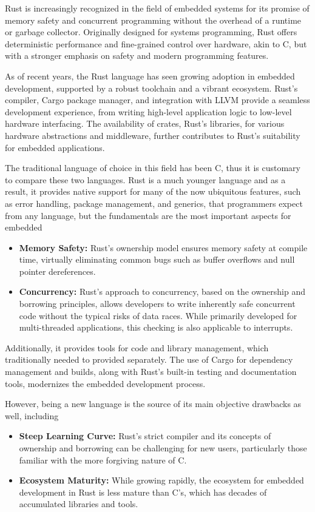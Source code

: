 
Rust is increasingly recognized in the field of embedded systems for its promise of memory safety and concurrent programming without the overhead of a runtime or garbage collector. Originally designed for systems programming, Rust offers deterministic performance and fine-grained control over hardware, akin to C, but with a stronger emphasis on safety and modern programming features.

As of recent years, the Rust language has seen growing adoption in embedded development, supported by a robust toolchain and a vibrant ecosystem. Rust's compiler, Cargo package manager, and integration with LLVM provide a seamless development experience, from writing high-level application logic to low-level hardware interfacing. The availability of crates, Rust's libraries, for various hardware abstractions and middleware, further contributes to Rust's suitability for embedded applications.

The traditional language of choice in this field has been C, thus it is customary to compare these two languages. Rust is a much younger language and as a result, it provides native support for many of the now ubiquitous features, such as error handling, package management, and generics, that programmers expect from any language, but the fundamentals are the most important aspects for embedded
\begin{itemize}
    \item \textbf{Memory Safety:} Rust's ownership model ensures memory safety at compile time, virtually eliminating common bugs such as buffer overflows and null pointer dereferences.
    \item \textbf{Concurrency:} Rust's approach to concurrency, based on the ownership and borrowing principles, allows developers to write inherently safe concurrent code without the typical risks of data races. While primarily developed for multi-threaded applications, this checking is also applicable to interrupts.
\end{itemize}

Additionally, it provides tools for code and library management, which traditionally needed to provided separately. The use of Cargo for dependency management and builds, along with Rust's built-in testing and documentation tools, modernizes the embedded development process.

However, being a new language is the source of its main objective drawbacks as well, including
\begin{itemize}
    \item \textbf{Steep Learning Curve:} Rust's strict compiler and its concepts of ownership and borrowing can be challenging for new users, particularly those familiar with the more forgiving nature of C.
    \item \textbf{Ecosystem Maturity:} While growing rapidly, the ecosystem for embedded development in Rust is less mature than C's, which has decades of accumulated libraries and tools.
\end{itemize}

